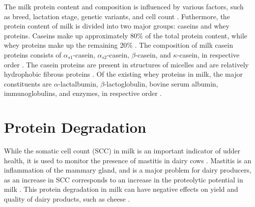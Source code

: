\vspace{0.5em}
The milk protein content and composition is influenced by various factors, such as breed, lactation stage, genetic variants, and cell count \cite*{s04_protein_fraction_in_milk}. Futhermore, the protein content of milk is divided into two major groups: caseins and whey proteins. Caseins make up approximately 80\% of the total protein content, while whey proteins make up the remaining 20\% \cite*{s04_protein_fraction_in_milk}. The composition of milk casein proteins consists of $\alpha_{s1}$-casein, $\alpha_{s2}$-casein, $\beta$-casein, and $\kappa$-casein, in respective order \cite*{s04_protein_fraction_in_milk}. The casein proteins are present in structures of micelles and are relatively hydrophobic fibrous proteins \cite*{b01_milk_biochemistry}. Of the existing whey proteins in milk, the major constituents are $\alpha$-lactalbumin, $\beta$-lactoglobulin, bovine serum albumin, immunoglobulins, and enzymes, in respective order \cite*{s04_protein_fraction_in_milk}.




%


\section{Protein Degradation}
While the somatic cell count (SCC) in milk is an important indicator of udder health, it is used to monitor the presence of mastitis in dairy cows \cite*{s05_mastitis_complex}. Mastitis is an inflammation of the mammary gland, and is a major problem for dairy producers, as an increase in SCC corresponds to an increase in the proteolytic potential in milk \cite*{a02_proteases_and_protein_degradation}. This protein degradation in milk can have negative effects on yield and quality of dairy products, such as cheese \cite*{a02_proteases_and_protein_degradation}.


